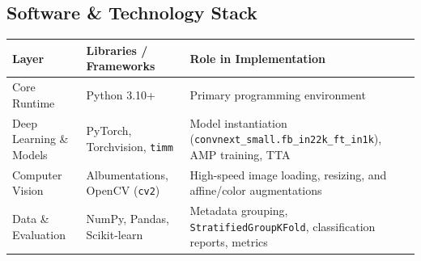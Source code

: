 \documentclass[12pt,a4paper]{article}
\begin{document}
\subsection{Software \& Technology Stack}
\begin{table}[h!]
\centering
\renewcommand{\arraystretch}{1.2}
\begin{tabularx}{\textwidth}{l l X}
\toprule
\textbf{Layer} & \textbf{Libraries / Frameworks} & \textbf{Role in Implementation} \\
\midrule
Core Runtime & Python 3.10+ & Primary programming environment \\
Deep Learning \& Models & PyTorch, Torchvision, \texttt{timm} & Model instantiation (\texttt{convnext\_small.fb\_in22k\_ft\_in1k}), AMP training, TTA \\
Computer Vision & Albumentations, OpenCV (\texttt{cv2}) & High-speed image loading, resizing, and affine/color augmentations \\
Data \& Evaluation & NumPy, Pandas, Scikit-learn & Metadata grouping, \texttt{StratifiedGroupKFold}, classification reports, metrics \\
\bottomrule
\end{tabularx}
\end{table}
\end{document}
